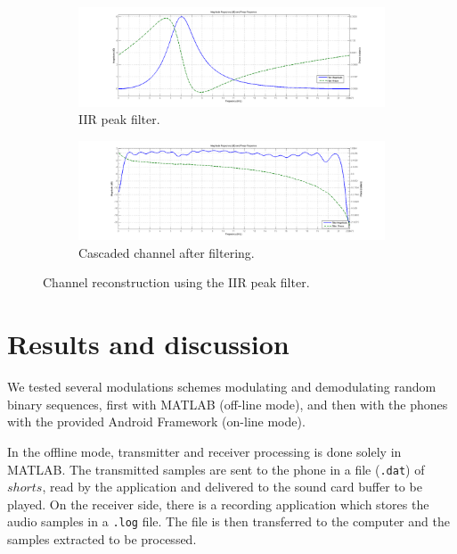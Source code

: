 \documentclass[12pt,a4paper,openright]{report}
\begin{document}
\begin{figure}[H]
\centering
\begin{subfigure}[H]{.8\textwidth}
  \centering
  \includegraphics[width=1\linewidth]{peakFilter.png}
  \caption{IIR peak filter.}
  \label{fig:IIRpeak}
  \quad
\end{subfigure}%
\quad
\begin{subfigure}[H]{.8\textwidth}
  \centering
  \includegraphics[width=1\linewidth]{reconstChan.png}
  \caption{Cascaded channel after filtering.}
  \label{fig:cascadefilter}
\end{subfigure}
\caption[Channel reconstruction using the IIR peak filter]{Channel reconstruction using the IIR peak filter.}
   \label{fig:chanReconstruction}
    \end{figure}



\chapter{Results and discussion}
We tested several modulations schemes modulating and demodulating random binary sequences, first with MATLAB (off-line mode), and then with the phones with the provided Android Framework (on-line mode). 

In the offline mode, transmitter and receiver processing is done solely in MATLAB. The transmitted samples are sent to the phone in a file (\texttt{.dat}) of $shorts$, read by the application and delivered to the sound card buffer to be played. On the receiver side, there is a recording application which stores the audio samples in a \texttt{.log} file. The file is then transferred to the computer and the samples extracted to be processed. 
\end{document}
